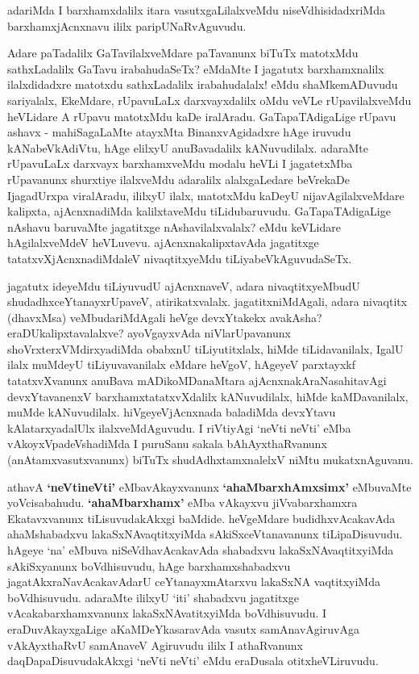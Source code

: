 \begin{artha}
adariMda I barxhamxdalilx itara vasutxgaLilalxveMdu
niseVdhisidadxriMda barxhamxjAcnxnavu ililx paripUNaRvAguvudu. 

Adare paTadalilx GaTavilalxveMdare paTavanunx biTuTx matotxMdu
sathxLadalilx GaTavu irabahudaSeTx? eMdaMte I jagatutx barxhamxnalilx
ilalxdidadxre matotxdu sathxLadalilx irabahudalalx! eMdu
shaMkemADuvudu sariyalalx, EkeMdare, rUpavuLaLx darxvayxdalilx oMdu
veVLe rUpavilalxveMdu heVLidare A rUpavu matotxMdu kaDe
iralAradu. GaTapaTAdigaLige rUpavu ashavx - mahiSagaLaMte atayxMta
BinanxvAgidadxre hAge iruvudu kANabeVkAdiVtu, hAge elilxyU
anuBavadalilx kANuvudilalx. adaraMte rUpavuLaLx darxvayx barxhamxveMdu
modalu heVLi I jagatetxMba rUpavanunx shurxtiye ilalxveMdu adaralilx
alalxgaLedare beVrekaDe IjagadUrxpa viralAradu, ililxyU ilalx,
matotxMdu kaDeyU nijavAgilalxveMdare kalipxta, ajAcnxnadiMda
kalilxtaveMdu tiLidubaruvudu. GaTapaTAdigaLige nAshavu baruvaMte
jagatitxge nAshavilalxvalalx? eMdu keVLidare hAgilalxveMdeV
heVLuvevu. ajAcnxnakalipxtavAda jagatitxge tatatxvXjAcnxnadiMdaleV
nivaqtitxyeMdu tiLiyabeVkAguvudaSeTx.
\end{artha}

\begin{artha}
jagatutx ideyeMdu tiLiyuvudU ajAcnxnaveV, adara nivaqtitxyeMbudU
 shudadhxceYtanayxrUpaveV, atirikatxvalalx. jagatitxniMdAgali, adara
nivaqtitx (dhavxMsa) veMbudariMdAgali heVge devxYtakekx avakAsha?
eraDUkalipxtavalalxve? ayoVgayxvAda niVlarUpavanunx
shoVrxterxVMdirxyadiMda obabxnU tiLiyutitxlalx, hiMde
tiLidavanilalx, IgalU ilalx muMdeyU tiLiyuvavanilalx eMdare heVgoV,
hAgeyeV parxtayxkf tatatxvXvanunx anuBava mADikoMDanaMtara ajAcnxnakAraNasahitavAgi devxYtavanenxV barxhamxtatatxvXdalilx kANuvudilalx, hiMde
kaMDavanilalx, muMde kANuvudilalx. hiVgeyeVjAcnxnada baladiMda
devxYtavu kAlatarxyadalUlx ilalxveMdAguvudu. I riVtiyAgi `neVti neVti'
eMba vAkoyxVpadeVshadiMda I puruSanu sakala bAhAyxthaRvanunx
(anAtamxvasutxvanunx) biTuTx shudAdhxtamxnalelxV niMtu mukatxnAguvanu.
\end{artha}

\begin{center}
\end{center}

\begin{artha}
athavA \textbf{`neVtineVti'} eMbavAkayxvanunx \textbf{`ahaMbarxhAmxsimx'} eMbuvaMte
yoVcisabahudu.  \textbf{`ahaMbarxhamx'} eMba vAkayxvu
jiVvabarxhamxra Ekatavxvanunx tiLisuvudakAkxgi baMdide. heVgeMdare
budidhxvAcakavAda ahaMshabadxvu lakaSxNAvaqtitxyiMda
sAkiSxceVtanavanunx tiLipaDisuvudu. hAgeye `na' eMbuva
niSeVdhavAcakavAda shabadxvu lakaSxNAvaqtitxyiMda sAkiSxyanunx
boVdhisuvudu, hAge barxhamxshabadxvu jagatAkxraNavAcakavAdarU
ceYtanayxmAtarxvu lakaSxNA vaqtitxyiMda boVdhisuvudu. adaraMte ililxyU
`iti' shabadxvu jagatitxge vAcakabarxhamxvanunx lakaSxNAvatitxyiMda
boVdhisuvudu. I eraDuvAkayxgaLige aKaMDeYkasaravAda vasutx
samAnavAgiruvAga vAkAyxthaRvU samAnaveV Agiruvudu ililx I athaRvanunx
daqDapaDisuvudakAkxgi `neVti neVti' eMdu eraDusala otitxheVLiruvudu.
\end{artha}


